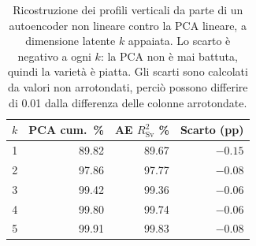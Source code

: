 \begin{table}[!ht]
    \centering
    \small
    \caption[Autoencoder contro PCA a dimensione latente appaiata.]{Ricostruzione
    dei profili verticali da parte di un autoencoder non lineare contro la PCA lineare,
    a dimensione latente $k$ appaiata. Lo scarto è negativo a ogni $k$: la PCA non è mai
    battuta, quindi la varietà è piatta. Gli scarti sono calcolati da valori non
    arrotondati, perciò possono differire di 0.01 dalla differenza delle colonne
    arrotondate.}
    \label{tab:ae-gap}
    \begin{tabular}{@{}crrr@{}}
        \toprule
        \textbf{$k$} & \textbf{PCA cum.\ \%} & \textbf{AE $R^2_{\mathrm{Sv}}$ \%} & \textbf{Scarto (pp)} \\
        \midrule
        1 & 89.82 & 89.67 & $-0.15$ \\
        2 & 97.86 & 97.77 & $-0.08$ \\
        3 & 99.42 & 99.36 & $-0.06$ \\
        4 & 99.80 & 99.74 & $-0.06$ \\
        5 & 99.91 & 99.83 & $-0.08$ \\
        \bottomrule
    \end{tabular}
\end{table}

